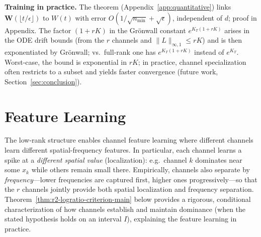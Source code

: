 \documentclass[nohyperref]{article}
\theoremstyle{plain}
\theoremstyle{definition}
\theoremstyle{remark}
\begin{document}
\textbf{Training in practice.} The theorem (Appendix~\ref{app:quantitative}) links $\mathbf{W}(\lfloor t/\epsilon\rfloor)$ to $W(t)$ with error $O(1/\sqrt{n_{\min}}+\sqrt{\epsilon})$, independent of $d$; proof in Appendix. The factor $(1+rK)$ in the Grönwall constant $e^{K_T(1+rK)}$ arises in the ODE drift bounds (from the $r$ channels and $\|L\|_{\infty,1}\le rK$) and is then exponentiated by Grönwall; vs.\ full-rank \cite{nguyen2023rigorousframeworkmeanfield} one has $e^{K_T(1+rK)}$ instead of $e^{K_T}$. Worst-case, the bound is exponential in $rK$; in practice, channel specialization often restricts to a subset and yields faster convergence (future work, Section~\ref{sec:conclusion}).























\section{Feature Learning}
\label{sec:channel-specialization}

The low-rank structure enables channel feature learning where different channels learn different spatial-frequency features. In particular, each channel learns a spike at a \emph{different spatial value} (localization): e.g.\ channel $k$ dominates near some $x_k$ while others remain small there. Empirically, channels also separate by \emph{frequency}---lower frequencies are captured first, higher ones progressively---so that the $r$ channels jointly provide both spatial localization and frequency separation. Theorem~\ref{thm:r2-logratio-criterion-main} below provides a rigorous, conditional characterization of how channels establish and maintain dominance (when the stated hypothesis holds on an interval $I$), explaining the feature learning in practice.
\end{document}
